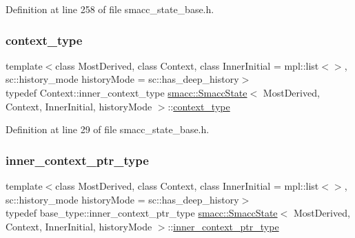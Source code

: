 Definition at line 258 of file smacc\+\_\+state\+\_\+base.\+h.

\mbox{\label{classsmacc_1_1SmaccState_a65c128d05dbcadbf817f41ba20b8fa01}} 
\subsubsection{\texorpdfstring{context\+\_\+type}{context\_type}}
{\footnotesize\ttfamily template$<$class Most\+Derived, class Context, class Inner\+Initial = mpl\+::list$<$$>$, sc\+::history\+\_\+mode history\+Mode = sc\+::has\+\_\+deep\+\_\+history$>$ \\
typedef Context\+::inner\+\_\+context\+\_\+type \hyperlink{classsmacc_1_1SmaccState}{smacc\+::\+Smacc\+State}$<$ Most\+Derived, Context, Inner\+Initial, history\+Mode $>$\+::\hyperlink{classsmacc_1_1SmaccState_a65c128d05dbcadbf817f41ba20b8fa01}{context\+\_\+type}}



Definition at line 29 of file smacc\+\_\+state\+\_\+base.\+h.

\mbox{\label{classsmacc_1_1SmaccState_a65a772c2e2039e9a59148ba6ffb54d8a}} 
\subsubsection{\texorpdfstring{inner\+\_\+context\+\_\+ptr\+\_\+type}{inner\_context\_ptr\_type}}
{\footnotesize\ttfamily template$<$class Most\+Derived, class Context, class Inner\+Initial = mpl\+::list$<$$>$, sc\+::history\+\_\+mode history\+Mode = sc\+::has\+\_\+deep\+\_\+history$>$ \\
typedef base\+\_\+type\+::inner\+\_\+context\+\_\+ptr\+\_\+type \hyperlink{classsmacc_1_1SmaccState}{smacc\+::\+Smacc\+State}$<$ Most\+Derived, Context, Inner\+Initial, history\+Mode $>$\+::\hyperlink{classsmacc_1_1SmaccState_a65a772c2e2039e9a59148ba6ffb54d8a}{inner\+\_\+context\+\_\+ptr\+\_\+type}}



